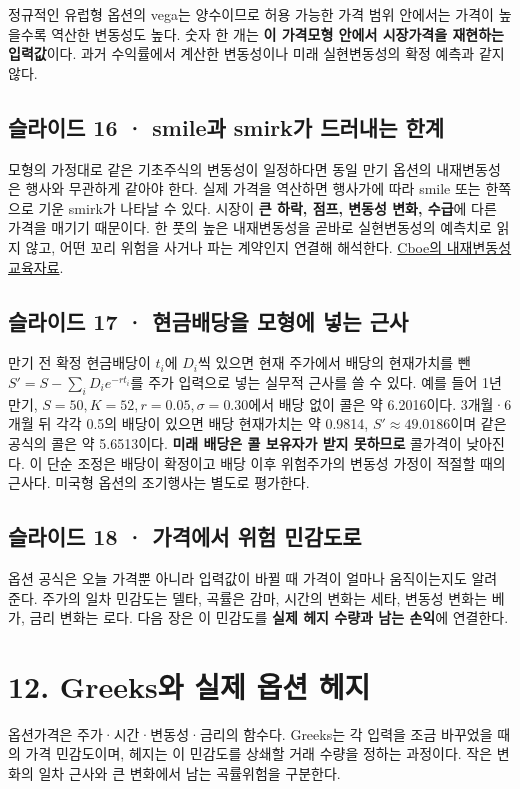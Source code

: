 \documentclass[11pt,a4paper]{article}
\begin{document}
정규적인 유럽형 옵션의 vega는 양수이므로 허용 가능한 가격 범위 안에서는 가격이 높을수록 역산한 변동성도 높다. 숫자 한 개는 \textbf{이 가격모형 안에서 시장가격을 재현하는 입력값}이다. 과거 수익률에서 계산한 변동성이나 미래 실현변동성의 확정 예측과 같지 않다.\par

\subsection{슬라이드 16 · smile과 smirk가 드러내는 한계}
모형의 가정대로 같은 기초주식의 변동성이 일정하다면 동일 만기 옵션의 내재변동성은 행사와 무관하게 같아야 한다. 실제 가격을 역산하면 행사가에 따라 smile 또는 한쪽으로 기운 smirk가 나타날 수 있다. 시장이 \textbf{큰 하락, 점프, 변동성 변화, 수급}에 다른 가격을 매기기 때문이다. 한 풋의 높은 내재변동성을 곧바로 실현변동성의 예측치로 읽지 않고, 어떤 꼬리 위험을 사거나 파는 계약인지 연결해 해석한다. \href{https://www.cboe.com/optionsinstitute/courses/options101/}{Cboe의 내재변동성 교육자료}.\par

\subsection{슬라이드 17 · 현금배당을 모형에 넣는 근사}
만기 전 확정 현금배당이 $t_i$에 $D_i$씩 있으면 현재 주가에서 배당의 현재가치를 뺀 $S'=S-\sum_iD_ie^{-rt_i}$를 주가 입력으로 넣는 실무적 근사를 쓸 수 있다. 예를 들어 1년 만기, $S=50,K=52,r=0.05,\sigma=0.30$에서 배당 없이 콜은 약 6.2016이다. 3개월·6개월 뒤 각각 0.5의 배당이 있으면 배당 현재가치는 약 0.9814, $S'\approx49.0186$이며 같은 공식의 콜은 약 5.6513이다. \textbf{미래 배당은 콜 보유자가 받지 못하므로} 콜가격이 낮아진다. 이 단순 조정은 배당이 확정이고 배당 이후 위험주가의 변동성 가정이 적절할 때의 근사다. 미국형 옵션의 조기행사는 별도로 평가한다.\par

\subsection{슬라이드 18 · 가격에서 위험 민감도로}
옵션 공식은 오늘 가격뿐 아니라 입력값이 바뀔 때 가격이 얼마나 움직이는지도 알려 준다. 주가의 일차 민감도는 델타, 곡률은 감마, 시간의 변화는 세타, 변동성 변화는 베가, 금리 변화는 로다. 다음 장은 이 민감도를 \textbf{실제 헤지 수량과 남는 손익}에 연결한다.\par

\section{12. Greeks와 실제 옵션 헤지}
옵션가격은 주가·시간·변동성·금리의 함수다. Greeks는 각 입력을 조금 바꾸었을 때의 가격 민감도이며, 헤지는 이 민감도를 상쇄할 거래 수량을 정하는 과정이다. 작은 변화의 일차 근사와 큰 변화에서 남는 곡률위험을 구분한다.\par
\end{document}
